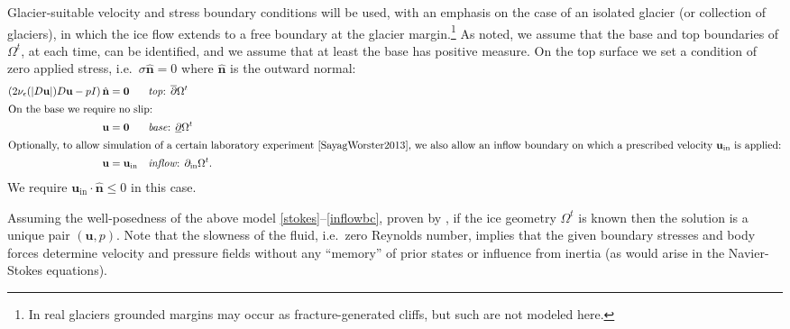 \documentclass[letterpaper,final,12pt,reqno]{amsart}
\newcommand{\eps}{\epsilon}
\newcommand{\hbn}{\hat{\mathbf{n}}}
\newcommand{\bu}{\mathbf{u}}
\newcommand{\bzero}{\bm{0}}
\begin{document}
Glacier-suitable velocity and stress boundary conditions will be used, with an emphasis on the case of an isolated glacier (or collection of glaciers), in which the ice flow extends to a free boundary at the glacier margin.\footnote{In real glaciers grounded margins may occur as fracture-generated cliffs, but such are not modeled here.}  As noted, we assume that the base and top boundaries of $\Omega^t$, at each time, can be identified, and we assume that at least the base has positive measure.  On the top surface we set a condition of zero applied stress, i.e.~$\sigma\hbn=0$ where $\hbn$ is the outward normal:
\begin{align}
\left(2 \nu_\eps(|D\bu|) D\bu - pI\right) \hbn &= \bzero  &&\text{\emph{top}: } \overline{\partial} \Omega^t \label{topbc} \\
\intertext{On the base we require no slip:}
\bu &= \bzero  &&\text{\emph{base}: } \underline{\partial} \Omega^t \label{basebc} \\
\intertext{Optionally, to allow simulation of a certain laboratory experiment \cite{SayagWorster2013}, we also allow an inflow boundary on which a prescribed velocity $\bu_{\text{in}}$ is applied:}
\bu &= \bu_{\text{in}}  &&\text{\emph{inflow}: } \partial_{\text{in}} \Omega^t. \label{inflowbc}
\end{align}
We require $\bu_{\text{in}}\cdot \hbn \le 0$ in this case.

Assuming the well-posedness of the above model \eqref{stokes}--\eqref{inflowbc}, proven by \cite{JouvetRappaz2011}, if the ice geometry $\Omega^t$ is known then the solution is a unique pair $(\bu,p)$.  Note that the slowness of the fluid, i.e.~zero Reynolds number, implies that the given boundary stresses and body forces determine velocity and pressure fields without any ``memory'' of prior states or influence from inertia (as would arise in the Navier-Stokes equations).
\end{document}
